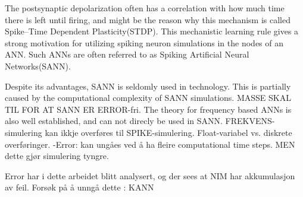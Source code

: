 	The postsynaptic depolarization often has a correlation with how much time there is left until firing, and might be the reason why this mechanism is called Spike--Time Dependent Plasticity(STDP).
	This mechanistic learning rule gives a strong motivation for utilizing spiking neuron simulations in the nodes of an ANN.
	Such ANNs are often referred to as Spiking Artificial Neural Networks(SANN).
	
	Despite its advantages, SANN is seldomly used in technology\cite{CITE}.
	This is partially caused by the computational complexity of SANN simulations\cite{CITE}.
	MASSE SKAL TIL FOR AT SANN ER ERROR-fri.
	The theory for frequency based ANNs is also well established, and can not direcly be used in SANN.
	FREKVENS-simulering kan ikkje overføres til SPIKE-simulering. Float-variabel vs. diskrete overføringer.
	-Error: kan ungåes ved å ha fleire computational time steps. MEN dette gjør simulering tyngre.
	
	Error har i dette arbeidet blitt analysert, og der sees at NIM har akkumulasjon av feil.
	Forsøk på å unngå dette : KANN





